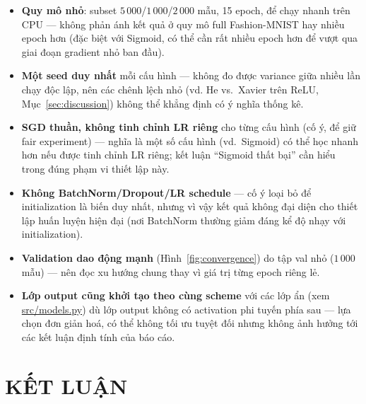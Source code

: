 \documentclass[12pt,a4paper]{report}
\begin{document}
\begin{itemize}
\item \textbf{Quy mô nhỏ}: subset $5\,000$/$1\,000$/$2\,000$ mẫu, 15
  epoch, để chạy nhanh trên CPU --- không phản ánh kết quả ở quy mô full
  Fashion-MNIST hay nhiều epoch hơn (đặc biệt với Sigmoid, có thể cần rất
  nhiều epoch hơn để vượt qua giai đoạn gradient nhỏ ban đầu).
\item \textbf{Một seed duy nhất} mỗi cấu hình --- không đo được
  variance giữa nhiều lần chạy độc lập, nên các chênh lệch nhỏ (vd. He vs.\
  Xavier trên ReLU, Mục~\ref{sec:discussion}) không thể khẳng định có ý
  nghĩa thống kê.
\item \textbf{SGD thuần, không tinh chỉnh LR riêng} cho từng cấu hình
  (cố ý, để giữ fair experiment) --- nghĩa là một số cấu hình (vd.\
  Sigmoid) có thể học nhanh hơn nếu được tinh chỉnh LR riêng; kết luận
  ``Sigmoid thất bại'' cần hiểu trong đúng phạm vi thiết lập này.
\item \textbf{Không BatchNorm/Dropout/LR schedule} --- cố ý loại bỏ để
  initialization là biến duy nhất, nhưng vì vậy kết quả không đại diện cho
  thiết lập huấn luyện hiện đại (nơi BatchNorm thường giảm đáng kể độ nhạy
  với initialization).
\item \textbf{Validation dao động mạnh} (Hình~\ref{fig:convergence}) do
  tập val nhỏ ($1\,000$ mẫu) --- nên đọc xu hướng chung thay vì giá trị
  từng epoch riêng lẻ.
\item \textbf{Lớp output cũng khởi tạo theo cùng scheme} với các lớp ẩn
  (xem \url{src/models.py}) dù lớp output không có activation phi tuyến
  phía sau --- lựa chọn đơn giản hoá, có thể không tối ưu tuyệt đối nhưng
  không ảnh hưởng tới các kết luận định tính của báo cáo.
\end{itemize}

\chapter*{KẾT LUẬN}
\end{document}
